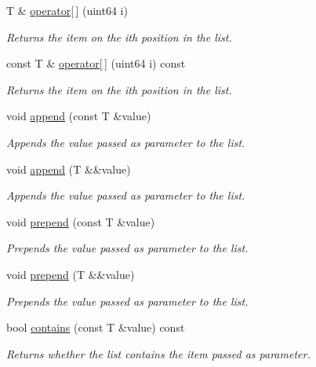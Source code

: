 \begin{DoxyCompactItemize}
T \& \mbox{\hyperlink{class_a_list_a85d2ad05e1b20339f6dfc64bcd37026f}{operator\mbox{[}$\,$\mbox{]}}} (uint64 i)
\begin{DoxyCompactList}\small\item\em Returns the item on the ith position in the list. \end{DoxyCompactList}\item 
const T \& \mbox{\hyperlink{class_a_list_a6bbd9c13506077c05b29f32a7fd0a4cf}{operator\mbox{[}$\,$\mbox{]}}} (uint64 i) const
\begin{DoxyCompactList}\small\item\em Returns the item on the ith position in the list. \end{DoxyCompactList}\item 
void \mbox{\hyperlink{class_a_list_a210e9e0657a0f4541247a290d21b6d23}{append}} (const T \&value)
\begin{DoxyCompactList}\small\item\em Appends the value passed as parameter to the list. \end{DoxyCompactList}\item 
void \mbox{\hyperlink{class_a_list_ac8e33a3962d74310ebafc8d99be5437a}{append}} (T \&\&value)
\begin{DoxyCompactList}\small\item\em Appends the value passed as parameter to the list. \end{DoxyCompactList}\item 
void \mbox{\hyperlink{class_a_list_a35838eb653492086769df4c444e08281}{prepend}} (const T \&value)
\begin{DoxyCompactList}\small\item\em Prepends the value passed as parameter to the list. \end{DoxyCompactList}\item 
void \mbox{\hyperlink{class_a_list_a6cae264346546d9e6cc68252a2e0b3d5}{prepend}} (T \&\&value)
\begin{DoxyCompactList}\small\item\em Prepends the value passed as parameter to the list. \end{DoxyCompactList}\item 
bool \mbox{\hyperlink{class_a_list_ab3db4e8f60d5abf4e7a12d928fb244a0}{contains}} (const T \&value) const
\begin{DoxyCompactList}\small\item\em Returns whether the list contains the item passed as parameter. \end{DoxyCompactList}\item 

\end{DoxyCompactItemize}
